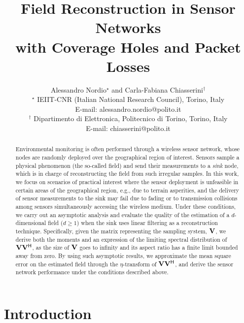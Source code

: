 \documentclass[11pt, draftcls, onecolumn, a4paper]{IEEEtran}
\newcommand{\Vm}{{\bf V}}
\def\Herm{\mathsf{^H}}
\begin{document}
\title{Field Reconstruction in Sensor Networks\\
with Coverage Holes and Packet Losses}
\author{Alessandro Nordio$^\star$ and Carla-Fabiana Chiasserini$^\dag$
\vspace{3mm}\\
$^\star$ IEIIT-CNR (Italian National Research Council), Torino, Italy\\
        E-mail: alessandro.nordio@polito.it
\vspace{3mm}\\
$^\dag$ Dipartimento di Elettronica, Politecnico di Torino, Torino, Italy\\
        E-mail: chiasserini@polito.it}

\maketitle

\begin{abstract}
Environmental monitoring is often performed through a wireless sensor
network, whose nodes are randomly deployed over the geographical
region of interest. Sensors sample a physical phenomenon (the
so-called field) and send their measurements to a {\em sink} node,
which is in charge of reconstructing the field from such irregular
samples.  In this work, we focus on scenarios of practical interest
where the sensor deployment is unfeasible in certain areas of the 
geographical region,
e.g., due to terrain asperities, and the delivery of sensor
measurements to the sink may fail due to fading or to transmission collisions 
among sensors simultaneously accessing the wireless medium.
Under these conditions, we carry out an asymptotic analysis and evaluate
the quality of the estimation of a $d$-dimensional field ($d\geq 1$) 
when the sink uses linear filtering as a reconstruction technique.
Specifically, given the matrix representing the sampling system,
$\Vm$, we derive both the moments and an expression of the limiting
spectral distribution of $\Vm\Vm\Herm$, as the size of $\Vm$ goes to
infinity and its aspect ratio has a finite limit bounded away from
zero.  By using such asymptotic results, we approximate the mean
square error on the estimated field through the $\eta$-transform of
$\Vm\Vm\Herm$, and derive the sensor network performance 
under the conditions described above.
\end{abstract}


\section{Introduction}
\end{document}

